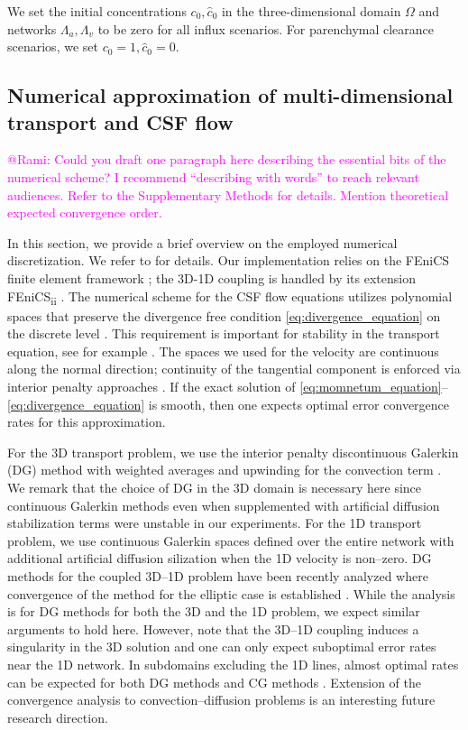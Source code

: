 \documentclass[fleqn,10pt]{wlscirep}
\newcommand{\mer}[1]{\textcolor{magenta}{#1}}
\begin{document}
We set the initial concentrations $c_0, \hat{c}_0$ in the
three-dimensional domain $\Omega$ and networks $\Lambda_a, \Lambda_v$
to be zero for all influx scenarios. For parenchymal
clearance scenarios, we set $c_0 = 1, \hat{c}_0 = 0$.

\subsection*{Numerical approximation of multi-dimensional transport and CSF flow}

\mer{@Rami: Could you draft one paragraph here describing the essential bits of the numerical scheme? I recommend ``describing with words'' to reach relevant audiences. Refer to the Supplementary Methods for details. Mention theoretical expected convergence order.} 

In this section, we provide a brief overview on the employed numerical discretization.  
We refer to  for details. 
Our implementation relies on the FEniCS finite element framework \cite{logg2012automated}; the 3D-1D coupling is handled by its extension FEniCS\textsubscript{ii} \cite{kuchta2020assembly}.
The numerical scheme for the CSF flow equations utilizes polynomial spaces that preserve the divergence free condition \eqref{eq:divergence_equation} on the discrete level \cite{hong2016robust}. This requirement is important for stability in the transport equation, see for example \cite{cesmelioglu2022compatible}. The spaces we used for the velocity are continuous along the normal direction; continuity of the tangential component is enforced via interior penalty approaches \cite{hong2016robust}.  If the exact solution of \eqref{eq:momnetum_equation}--\eqref{eq:divergence_equation} is smooth, then one expects optimal error convergence rates for this approximation. 

For the 3D transport problem, we use the interior penalty discontinuous Galerkin (DG) method with weighted averages and upwinding for the convection term \cite{ern2009discontinuous}.  We remark that the choice of DG in the 3D domain is necessary here since  continuous Galerkin methods even when supplemented with artificial diffusion stabilization terms were unstable in our experiments. For the 1D transport problem, we use continuous Galerkin spaces defined over the entire network with additional artificial diffusion silization when the 1D velocity is non--zero.  DG methods for the coupled 3D--1D problem have been recently analyzed  where convergence of the method for the elliptic case is established \cite{masri2024discontinuous}. While the analysis is for DG methods for both the 3D and the 1D problem, we expect similar arguments to hold here. However, note that the 3D--1D coupling induces a singularity in the 3D solution and one can only expect suboptimal error rates near the 1D network. In subdomains excluding the 1D lines, almost optimal rates can be expected for both DG methods \cite{masri2023discontinuous} and CG methods \cite{koppl2016local}.  Extension of the convergence analysis to convection--diffusion problems is an interesting future research direction. 
\end{document}
